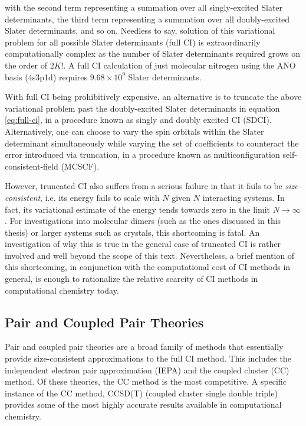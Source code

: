 \noindent with the second term representing a summation over all singly-excited
Slater determinants, the third term representing a summation over all
doubly-excited Slater determinants, and so on. Needless to say, solution of this
variational problem for all possible Slater determinants (full CI) is
extraordinarily computationally complex as the number of Slater determinants
required grows on the order of $2K!$. A full CI calculation of just molecular
nitrogen using the ANO basis (4s3p1d) requires $9.68 \times 10^9$ Slater
determinants. \cite{n2-ci}

With full CI being prohibitively expensive, an alternative is to truncate the
above variational problem past the doubly-excited Slater determinants in
equation \ref{eq:full-ci}, in a procedure known as singly and doubly excited CI
(SDCI). Alternatively, one can choose to vary the spin orbitals within the
Slater determinant simultaneously while varying the set of coefficients to
counteract the error introduced via truncation, in a procedure known as
multiconfiguration self-consistent-field (MCSCF).

However, truncated CI also suffers from a serious failure in that it fails to be
\emph{size-consistent}, i.e. its energy fails to scale with $N$ given $N$
interacting systems. In fact, its variational estimate of the energy tends
towards zero in the limit $N \rightarrow \infty$. For investigations into
molecular dimers (such as the ones discussed in this thesis) or larger systems
such as crystals, this shortcoming is fatal.  An investigation of why this is
true in the general case of truncated CI is rather involved and well beyond the
scope of this text.  Nevertheless, a brief mention of this shortcoming, in
conjunction with the computational cost of CI methods in general, is enough to
rationalize the relative scarcity of CI methods in computational chemistry
today.

\subsection{Pair and Coupled Pair Theories}

Pair and coupled pair theories are a broad family of methods that essentially
provide size-consistent approximations to the full CI method. This includes the
independent electron pair approximation (IEPA) and the coupled cluster (CC)
method. Of these theories, the CC method is the most competitive. A specific
instance of the CC method, CCSD(T) (coupled cluster single double triple)
provides some of the most highly accurate results available in computational
chemistry. \cite{cc1, cc2, cc3, cc4}

